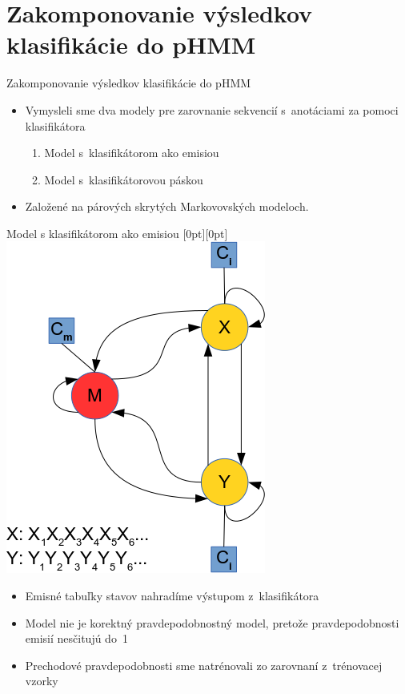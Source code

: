 \documentclass[xcolor=dvipsnames, compress, 12pt]{beamer}
\newcommand{\lenitem}[2][.6\linewidth]{\parbox[t]{#1}{\strut #2\strut}}
\theoremstyle{definition}
\begin{document}
\section{Zakomponovanie výsledkov klasifikácie do pHMM}
\begin{frame}{Zakomponovanie výsledkov klasifikácie do pHMM}

\begin{itemize}
  \item Vymysleli sme dva modely pre zarovnanie sekvencií s~anotáciami za pomoci klasifikátora
  \begin{enumerate}
    \item Model s~klasifikátorom ako emisiou
    \item Model s~klasifikátorovou páskou
  \end{enumerate}
  \item Založené na párových skrytých Markovovských modeloch.
\end{itemize}

\end{frame}

\begin{frame}{Model s klasifikátorom ako emisiou}
  \mbox{}\hfill\raisebox{-\height}[0pt][0pt]{
   \includegraphics[width=.30\textwidth]{images/zakladny_model}
   }
  \vspace*{-\baselineskip}

  \begin{itemize}
    \item \lenitem{Emisné tabuľky stavov nahradíme výstupom z~klasifikátora}
    \item \lenitem{Model nie je korektný pravdepodobnostný model, pretože pravdepodobnosti emisií nesčitujú do~1}
    \item \lenitem{Prechodové pravdepodobnosti sme natrénovali zo zarovnaní z~trénovacej vzorky}
  \end{itemize}
\end{frame}

\end{document}
